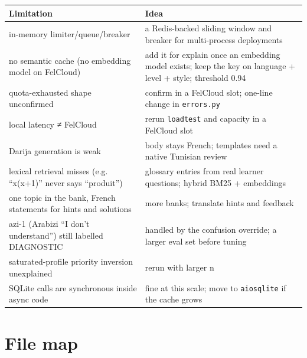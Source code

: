 \documentclass[11pt,a4paper]{article}
\renewcommand{\_}{\origus\allowbreak}
\begin{document}
\begin{tabularx}{\linewidth}{@{}L{6.2cm} Y@{}}
\toprule
\textbf{Limitation} & \textbf{Idea}\\
\midrule
in-memory limiter/queue/breaker & a Redis-backed sliding window and breaker for multi-process deployments\\
no semantic cache (no embedding model on FelCloud) & add it for explain once an embedding model exists; keep the key on language + level + style; threshold 0.94\\
quota-exhausted shape unconfirmed & confirm in a FelCloud slot; one-line change in \texttt{errors.py}\\
local latency ≠ FelCloud & rerun \texttt{load\_test} and capacity in a FelCloud slot\\
Darija generation is weak & body stays French; templates need a native Tunisian review\\
lexical retrieval misses (e.g. ``x(x+1)'' never says ``produit'') & glossary entries from real learner questions; hybrid BM25 + embeddings\\
one topic in the bank, French statements for hints and solutions & more banks; translate hints and feedback\\
azi-1 (Arabizi ``I don't understand'') still labelled DIAGNOSTIC & handled by the confusion override; a larger eval set before tuning\\
saturated-profile priority inversion unexplained & rerun with larger n\\
SQLite calls are synchronous inside async code & fine at this scale; move to \texttt{aiosqlite} if the cache grows\\
\bottomrule
\end{tabularx}

\appendix
\section{File map}
\end{document}
